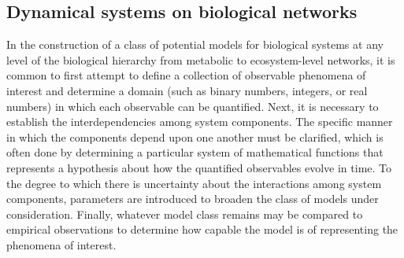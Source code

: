 \subsection{Dynamical systems on biological networks}
In the construction of a class of potential models for biological systems at any level of the biological hierarchy from metabolic to ecosystem-level networks, it is common to first attempt to define a collection of observable phenomena of interest and determine a domain (such as binary numbers, integers, or real numbers) in which each observable can be quantified. Next, it is necessary to establish the interdependencies among system components. The specific manner in which the components depend upon one another must be clarified, which is often done by determining a particular system of mathematical functions that represents a hypothesis about how the quantified observables evolve in time. To the degree to which there is uncertainty about the interactions among system components, parameters are introduced to broaden the class of models under consideration. Finally, whatever model class remains may be compared to empirical observations to determine how capable the model is of representing the phenomena of interest.

